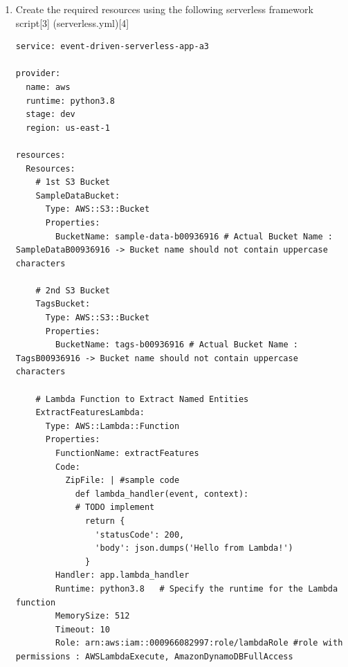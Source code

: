 \begin{enumerate}
\item Create the required resources using the following serverless framework script[3] (serverless.yml)[4] 






\begin{mdframed}[linewidth=1pt]
\lstset{language=YAML}
\begin{lstlisting}[basicstyle=\ttfamily\small, breaklines=true]
service: event-driven-serverless-app-a3

provider:
  name: aws
  runtime: python3.8
  stage: dev
  region: us-east-1

resources:
  Resources:
    # 1st S3 Bucket
    SampleDataBucket:
      Type: AWS::S3::Bucket
      Properties:
        BucketName: sample-data-b00936916 # Actual Bucket Name : SampleDataB00936916 -> Bucket name should not contain uppercase characters

    # 2nd S3 Bucket
    TagsBucket:
      Type: AWS::S3::Bucket
      Properties:
        BucketName: tags-b00936916 # Actual Bucket Name : TagsB00936916 -> Bucket name should not contain uppercase characters

    # Lambda Function to Extract Named Entities
    ExtractFeaturesLambda:
      Type: AWS::Lambda::Function
      Properties:
        FunctionName: extractFeatures
        Code:
          ZipFile: | #sample code
            def lambda_handler(event, context):
            # TODO implement
              return {
                'statusCode': 200,
                'body': json.dumps('Hello from Lambda!')
              }
        Handler: app.lambda_handler
        Runtime: python3.8   # Specify the runtime for the Lambda function
        MemorySize: 512
        Timeout: 10
        Role: arn:aws:iam::000966082997:role/lambdaRole #role with permissions : AWSLambdaExecute, AmazonDynamoDBFullAccess


\end{lstlisting}
\end{mdframed}
\end{enumerate}
